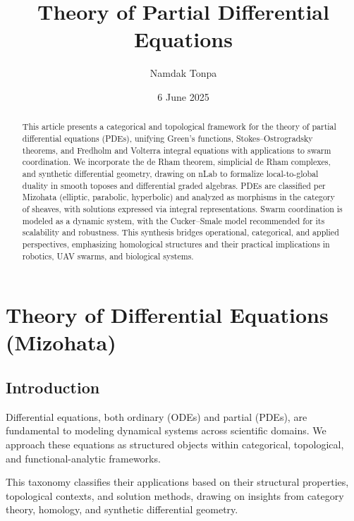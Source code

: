 \documentclass{article}
\theoremstyle{plain}
\begin{document}
\title{Theory of Partial Differential Equations}
\author{Namdak Tonpa}
\date{6 June 2025}
\maketitle

\begin{abstract}
This article presents a categorical and topological framework for the theory
of partial differential equations (PDEs), unifying Green's functions,
Stokes--Ostrogradsky theorems, and Fredholm and Volterra integral
equations with applications to swarm coordination. We incorporate
the de Rham theorem, simplicial de Rham complexes,
and synthetic differential geometry, drawing on nLab to formalize
local-to-global duality in smooth toposes and differential graded algebras.
PDEs are classified per Mizohata (elliptic, parabolic, hyperbolic) and
analyzed as morphisms in the category of sheaves, with solutions expressed
via integral representations. Swarm coordination is modeled as a dynamic
system, with the Cucker--Smale model recommended for its scalability and
robustness. This synthesis bridges operational, categorical, and applied
perspectives, emphasizing homological structures and their practical
implications in robotics, UAV swarms, and biological systems.
\end{abstract}


\tableofcontents

\section{Theory of Differential Equations (Mizohata)}

\subsection{Introduction}

Differential equations, both ordinary (ODEs) and partial (PDEs),
are fundamental to modeling dynamical systems across scientific domains.
We approach these equations as structured objects within categorical,
topological, and functional-analytic frameworks.

This taxonomy classifies their applications based on their structural properties,
topological contexts, and solution methods, drawing on insights from category theory,
homology, and synthetic differential geometry.
\end{document}
